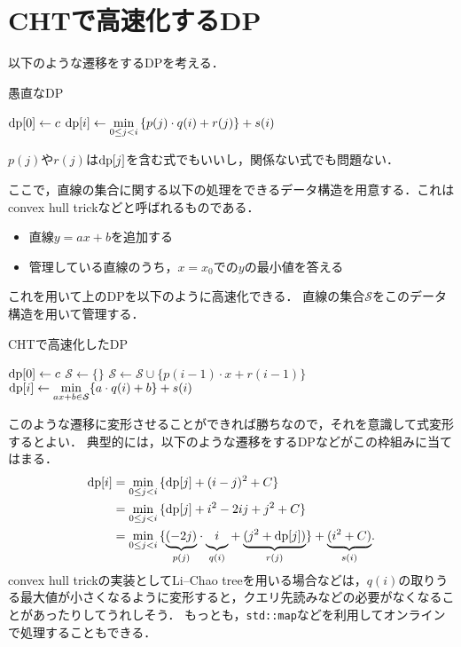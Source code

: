 \documentclass{jsarticle}
\newcommand{\DP}{\ensuremath\mathrm{dp}}
\begin{document}
\section{CHTで高速化するDP}

以下のような遷移をするDPを考える．
\begin{alg}
  \caption{愚直なDP}
  {$\DP[0] \gets c$}
  {
    {$\displaystyle\DP[i] \gets \min_{0\le j < i}\,\{p(j)\cdot q(i) + r(j)\} + s(i)$}\;
  }
\end{alg}

\noindent
$p(j)$や$r(j)$は$\DP[j]$を含む式でもいいし，関係ない式でも問題ない．

ここで，直線の集合に関する以下の処理をできるデータ構造を用意する．これはconvex hull trickなどと呼ばれるものである．
\begin{itemize}
\item 直線$y=ax+b$を追加する
\item 管理している直線のうち，$x=x_0$での$y$の最小値を答える
\end{itemize}

これを用いて上のDPを以下のように高速化できる．
直線の集合$\mathcal{S}$をこのデータ構造を用いて管理する．
\begin{alg}
  \caption{CHTで高速化したDP}
  {$\DP[0] \gets c$}\;
  {$\mathcal{S} \gets \{\}$}\;
  {
    {$\mathcal{S} \gets \mathcal{S} \cup \{p(i-1)\cdot x+r(i-1)\}$}\;
    {$\displaystyle\DP[i] \gets \min_{ax+b\in\mathcal{S}} \{a\cdot q(i)+b\}+s(i)$}\;
  }
\end{alg}

このような遷移に変形させることができれば勝ちなので，それを意識して式変形するとよい．
典型的には，以下のような遷移をするDPなどがこの枠組みに当てはまる．
\begin{align*}
  \DP[i]
  &= \min_{0\le j < i}\,\{\DP[j] + (i-j)^2 + C\}\\
  &= \min_{0\le j < i}\,\{\DP[j] + i^2-2ij+j^2+C\}\\
  &= \min_{0\le j < i}\,\{\underset{p(j)}{\underbrace{(-2j)}}\cdot \underset{q(i)}{\underbrace{\mathstrut i}} + \underset{r(j)}{\underbrace{(j^2+\DP[j])}}\} + \underset{s(i)}{\underbrace{(i^2+C)}}.
\end{align*}
convex hull trickの実装としてLi--Chao treeを用いる場合などは，$q(i)$の取りうる最大値が小さくなるように変形すると，クエリ先読みなどの必要がなくなることがあったりしてうれしそう．
もっとも，\texttt{std::map}などを利用してオンラインで処理することもできる．
\end{document}
